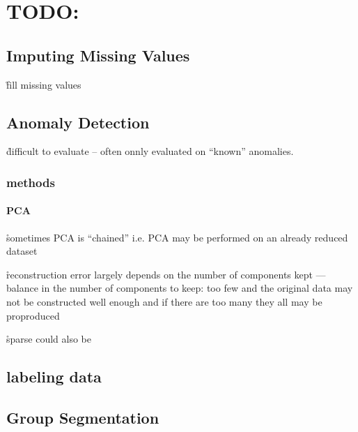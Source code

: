 \chapter{TODO:}

\section{Imputing Missing Values}
\label{appendix:imputing_missing_values}

\r{fill missing values}




\section{Anomaly Detection}

\r{difficult to evaluate -- often onnly evaluated on ``known'' anomalies.}

\subsection{methods}

\subsubsection{PCA}


\r{sometimes PCA is ``chained'' i.e. PCA may be performed on an already reduced dataset}

\r{reconstruction error largely depends on the number of components kept --- balance in the number of components to keep: too few and the original data may not be constructed well enough and if there are too many they all may be proproduced}

\r{sparse could also be }



\section{labeling data}


\section{Group Segmentation}

